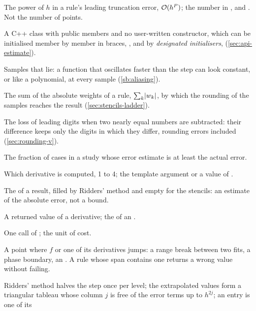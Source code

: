 \begin{description}\setlength{\itemsep}{1pt}
  \item[accuracy order $\aorder$] The power of $h$ in a rule's leading truncation error, $\mathcal{O}(h^{P})$;
    the number in ,  and . Not the number of points.
  \item[aggregate] A C++ class with public members and no user-written constructor, which can be initialised
    member by member in braces, , and by \emph{designated initialisers},
     (\cref{sec:api-estimate}).
  \item[aliasing] Samples that lie: a function that oscillates faster than the step can look constant, or like a
    polynomial, at every sample (\cref{sb:aliasing}).
  \item[amplification $\ampl$] The sum of the absolute weights of a rule, $\sum_k \lvert w_k \rvert$, by which the rounding
    of the samples reaches the result (\cref{sec:stencils-ladder}).
  \item[cancellation] The loss of leading digits when two nearly equal numbers are subtracted: their difference keeps
    only the digits in which they differ, rounding errors included (\cref{sec:rounding-v}).
  \item[coverage] The fraction of cases in a study whose error estimate is at least the actual error.
  \item[derivative order $\dorder$] Which derivative is computed, 1 to 4; the template argument  or a
    value of .
  \item[error estimate] The  of a result, filled by Ridders' method and empty for the stencils: an
    estimate of the absolute error, not a bound.
  \item[estimate] A returned value of a derivative; the  of an .
  \item[evaluation] One call of ; the unit of cost.
  \item[kink] A point where $f$ or one of its derivatives jumps: a range break between two fits, a phase boundary,
    an . A rule whose span contains one returns a wrong value without failing.
  \item[level, column, entry, tableau] Ridders' method halves the step once per level; the extrapolated values
    form a triangular tableau whose column $j$ is free of the error terms up to $h^{2j}$; an entry is one of its

\end{description}
